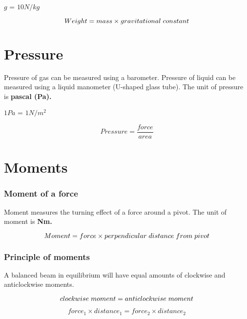 \documentclass{report}
\begin{document}
\begin{flushleft}
\smallskip $g$ = $10 N/kg$

\begin{equation}
Weight = mass \times gravitational \hspace{1mm} constant 
\end{equation}

\section*{Pressure}
\normalfont Pressure of gas can be measured using a barometer. Pressure of liquid can be measured using a liquid manometer (U-shaped glass tube). The unit of pressure is \bf{pascal (Pa)}. 

\smallskip $1 Pa$ = $1N/m^2$

\begin{equation}
Pressure = \frac{force}{area}
\end{equation}

\section*{Moments}
\subsubsection*{Moment of a force}
\normalfont Moment measures the turning effect of a force around a pivot. The unit of moment is \bf{Nm}.

\begin{equation}
Moment = force \times perpendicular \hspace{1mm} distance \hspace{1mm} from \hspace{1mm} pivot
\end{equation}

\subsubsection{Principle of moments}
\normalfont A balanced beam in equilibrium will have equal amounts of clockwise and anticlockwise moments. 

\begin{equation}
clockwise \hspace{1mm } moment = anticlockwise \hspace{1mm} moment
\end{equation}

\begin{equation}
force_1 \times distance_1 = force_2 \times distance_2
\end{equation}


\end{flushleft}
\end{document}

